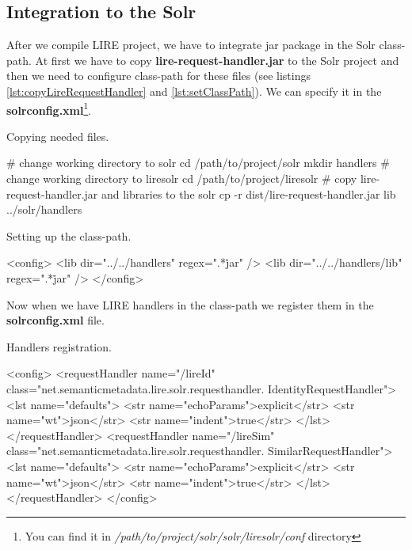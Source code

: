 \documentclass[12pt,a4paper]{report}
\begin{document}
\subsection{Integration to the Solr}

After we compile LIRE project, we have to integrate jar package in the Solr class-path. At first we have to copy \textbf{lire-request-handler.jar} to the Solr project and then we need to configure class-path for these files (see listings \ref{lst:copyLireRequestHandler} and \ref{lst:setClassPath}). We can specify it in the \textbf{solrconfig.xml}\footnote{You can find it in \textit{/path/to/project/solr/solr/liresolr/conf} directory}.

\begin{listing}[H]
\caption{Copying needed files.}
\label{lst:copyLireRequestHandler}
\begin{bashcode}
# change working directory to solr
cd /path/to/project/solr
mkdir handlers
# change working directory to liresolr
cd /path/to/project/liresolr
# copy lire-request-handler.jar and libraries to the solr
cp -r dist/lire-request-handler.jar lib ../solr/handlers
\end{bashcode}
\end{listing}

\begin{listing}[H]
\caption{Setting up the class-path.}
\label{lst:setClassPath}
\begin{xmlcode}
<config>
  <lib dir="../../handlers" regex=".*\.jar" />
  <lib dir="../../handlers/lib" regex=".*\.jar" />
</config>
\end{xmlcode}
\end{listing}

Now when we have LIRE handlers in the class-path we register them in the \textbf{solrconfig.xml} file.

\begin{listing}[H]
\caption{Handlers registration.}
\begin{xmlcode}
<config>
  <requestHandler name="/lireId"
  class="net.semanticmetadata.lire.solr.requesthandler.
  IdentityRequestHandler">
     <lst name="defaults">
       <str name="echoParams">explicit</str>
       <str name="wt">json</str>
       <str name="indent">true</str>
     </lst>
  </requestHandler>
  <requestHandler name="/lireSim"
  class="net.semanticmetadata.lire.solr.requesthandler.
  SimilarRequestHandler">
     <lst name="defaults">
       <str name="echoParams">explicit</str>
       <str name="wt">json</str>
       <str name="indent">true</str>
     </lst>
  </requestHandler>
</config>
\end{xmlcode}
\end{listing}
\end{document}

